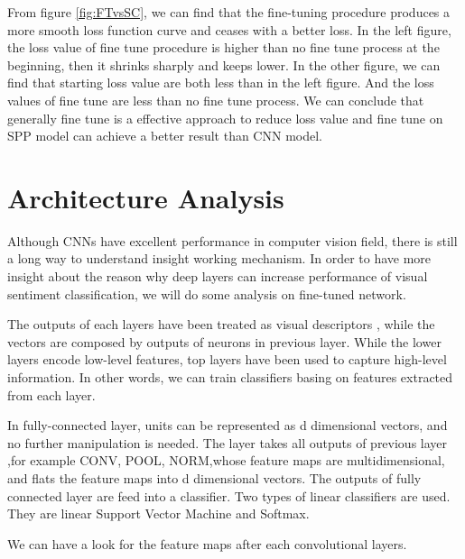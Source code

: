 From figure \ref{fig:FTvsSC}, we can find that the fine-tuning procedure produces a more smooth loss function curve and ceases with a better loss. In the left figure, the loss value of fine tune procedure is higher than no fine tune process at the beginning, then it shrinks sharply and keeps lower. In the other figure, we can find that starting loss value are both less than in the left figure. And the loss values of fine tune are less than no fine tune process. We can conclude that generally fine tune is a effective approach to reduce loss value and fine tune on SPP model can achieve a better result than CNN model.

\section{Architecture Analysis}

Although CNNs have excellent performance in computer vision field, there is still a long way to understand insight working mechanism. In order to have more insight about the reason why deep layers can increase performance of visual sentiment classification, we will do some analysis on fine-tuned network.

The outputs of each layers have been treated as visual descriptors \citep{razavian2014cnn}, while the vectors are composed by outputs of neurons in previous layer. While the lower layers encode low-level features, top layers have been used to capture high-level information. In other words, we can train classifiers basing on features extracted from each layer.

In fully-connected layer, units can be represented as d dimensional vectors, and no further manipulation is needed. The layer takes all outputs of previous layer ,for example CONV, POOL, NORM,whose feature maps are multidimensional, and flats the feature maps into d dimensional vectors. The outputs of fully connected layer are feed into a classifier. Two types of linear classifiers are used. They are linear Support Vector Machine and Softmax.

We can have a look for the feature maps after each convolutional layers.

